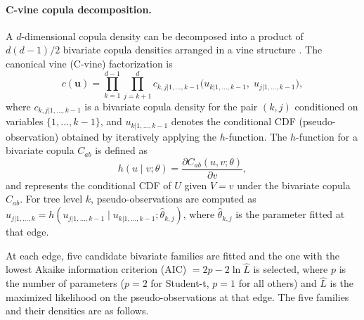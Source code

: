 \paragraph{C-vine copula decomposition.}
A $d$-dimensional copula density can be decomposed into a product of $d(d-1)/2$ bivariate copula densities arranged in a vine structure \cite{aas_pair_2009}. The canonical vine (C-vine) factorization is
\begin{equation}
    c(\mathbf{u}) = \prod_{k=1}^{d-1} \prod_{j=k+1}^{d} c_{k,j|1,\dots,k-1}\!\bigl(u_{k|1,\dots,k-1},\; u_{j|1,\dots,k-1}\bigr),
    \label{eq:cvine}
\end{equation}
where $c_{k,j|1,\dots,k-1}$ is a bivariate copula density for the pair $(k, j)$ conditioned on variables $\{1, \dots, k{-}1\}$, and $u_{k|1,\dots,k-1}$ denotes the conditional CDF (pseudo-observation) obtained by iteratively applying the $h$-function. The $h$-function for a bivariate copula $C_{ab}$ is defined as
\begin{equation}
    h(u \mid v; \theta) = \frac{\partial C_{ab}(u, v; \theta)}{\partial v},
    \label{eq:hfunc}
\end{equation}
and represents the conditional CDF of $U$ given $V = v$ under the bivariate copula $C_{ab}$. For tree level $k$, pseudo-observations are computed as $u_{j|1,\dots,k} = h(u_{j|1,\dots,k-1} \mid u_{k|1,\dots,k-1}; \hat{\theta}_{k,j})$, where $\hat{\theta}_{k,j}$ is the parameter fitted at that edge.

At each edge, five candidate bivariate families are fitted and the one with the lowest Akaike information criterion (AIC) $= 2p - 2\ln\hat{L}$ is selected, where $p$ is the number of parameters ($p=2$ for Student-t, $p=1$ for all others) and $\hat{L}$ is the maximized likelihood on the pseudo-observations at that edge. The five families and their densities are as follows.

